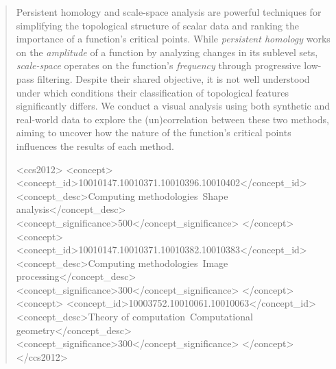 \documentclass{egpubl}
\begin{document}
\begin{abstract}
Persistent homology and scale-space analysis are powerful techniques for simplifying the topological structure of scalar data and ranking the importance of a function's critical points. While \emph{persistent homology} works on the \emph{amplitude} of a function by analyzing changes in its sublevel sets, \emph{scale-space} operates on the function's \emph{frequency} through progressive low-pass filtering. 
Despite their shared objective, it is not well understood under which conditions their classification of topological features significantly differs. We conduct a visual analysis using both synthetic and real-world data to explore the (un)correlation between these two methods, aiming to uncover how the nature of the function's critical points influences the results of each method.

\begin{CCSXML}
<ccs2012>
   <concept>
       <concept_id>10010147.10010371.10010396.10010402</concept_id>
       <concept_desc>Computing methodologies~Shape analysis</concept_desc>
       <concept_significance>500</concept_significance>
       </concept>
   <concept>
       <concept_id>10010147.10010371.10010382.10010383</concept_id>
       <concept_desc>Computing methodologies~Image processing</concept_desc>
       <concept_significance>300</concept_significance>
       </concept>
   <concept>
       <concept_id>10003752.10010061.10010063</concept_id>
       <concept_desc>Theory of computation~Computational geometry</concept_desc>
       <concept_significance>300</concept_significance>
       </concept>
 </ccs2012>
\end{CCSXML}

\printccsdesc
\end{abstract}



%

%
%

%

 
       
\end{document}
